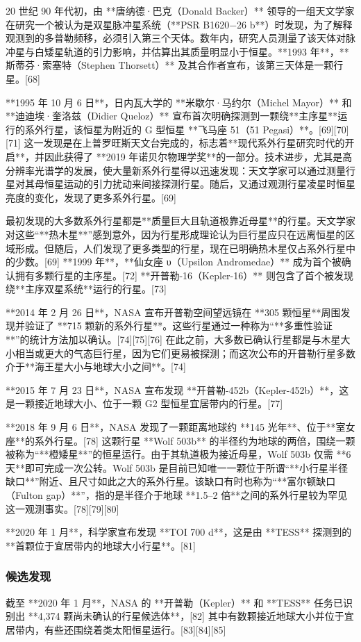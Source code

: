 20 世纪 90 年代初，由 **唐纳德·巴克（Donald Backer）** 领导的一组天文学家在研究一个被认为是双星脉冲星系统（**PSR B1620−26 b**）时发现，为了解释观测到的多普勒频移，必须引入第三个天体。数年内，研究人员测量了该天体对脉冲星与白矮星轨道的引力影响，并估算出其质量明显小于恒星。**1993 年**，**斯蒂芬·索塞特（Stephen Thorsett）** 及其合作者宣布，该第三天体是一颗行星。[68]

**1995 年 10 月 6 日**，日内瓦大学的 **米歇尔·马约尔（Michel Mayor）** 和 **迪迪埃·奎洛兹（Didier Queloz）** 宣布首次明确探测到一颗绕**主序星**运行的系外行星，该恒星为附近的 G 型恒星 **飞马座 51（51 Pegasi）**。[69][70][71] 这一发现是在上普罗旺斯天文台完成的，标志着**现代系外行星研究时代的开启**，并因此获得了 **2019 年诺贝尔物理学奖**的一部分。技术进步，尤其是高分辨率光谱学的发展，使大量新系外行星得以迅速发现：天文学家可以通过测量行星对其母恒星运动的引力扰动来间接探测行星。随后，又通过观测行星凌星时恒星亮度的变化，发现了更多系外行星。[69]

最初发现的大多数系外行星都是**质量巨大且轨道极靠近母星**的行星。天文学家对这些“**热木星**”感到意外，因为行星形成理论认为巨行星应只在远离恒星的区域形成。但随后，人们发现了更多类型的行星，现在已明确热木星仅占系外行星中的少数。[69] **1999 年**，**仙女座 υ（Upsilon Andromedae）** 成为首个被确认拥有多颗行星的主序星。[72] **开普勒-16（Kepler-16）** 则包含了首个被发现绕**主序双星系统**运行的行星。[73]

**2014 年 2 月 26 日**，NASA 宣布开普勒空间望远镜在 **305 颗恒星**周围发现并验证了 **715 颗新的系外行星**。这些行星通过一种称为“**多重性验证**”的统计方法加以确认。[74][75][76] 在此之前，大多数已确认行星都是与木星大小相当或更大的气态巨行星，因为它们更易被探测；而这次公布的开普勒行星多数介于**海王星大小与地球大小之间**。[74]

**2015 年 7 月 23 日**，NASA 宣布发现 **开普勒-452b（Kepler-452b）**，这是一颗接近地球大小、位于一颗 G2 型恒星宜居带内的行星。[77]

**2018 年 9 月 6 日**，NASA 发现了一颗距离地球约 **145 光年**、位于**室女座**的系外行星。[78] 这颗行星 **Wolf 503b** 的半径约为地球的两倍，围绕一颗被称为“**橙矮星**”的恒星运行。由于其轨道极为接近母星，Wolf 503b 仅需 **6 天**即可完成一次公转。Wolf 503b 是目前已知唯一一颗位于所谓“**小行星半径缺口**”附近、且尺寸如此之大的系外行星。该缺口有时也称为“**富尔顿缺口（Fulton gap）**”，指的是半径介于地球 **1.5–2 倍**之间的系外行星较为罕见这一观测事实。[78][79][80]

**2020 年 1 月**，科学家宣布发现 **TOI 700 d**，这是由 **TESS** 探测到的**首颗位于宜居带内的地球大小行星**。[81]

\subsubsection{候选发现}
截至 **2020 年 1 月**，NASA 的 **开普勒（Kepler）** 和 **TESS** 任务已识别出 **4,374 颗尚未确认的行星候选体**，[82] 其中有数颗接近地球大小并位于宜居带内，有些还围绕着类太阳恒星运行。[83][84][85]
